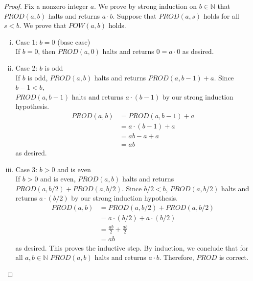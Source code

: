 \documentclass[11pt]{scrartcl}
\begin{document}
\begin{proof}
	Fix a nonzero integer $a$. We prove by strong induction on
	$b \in \mathbb{N}$ that $PROD(a, b)$ halts and returns $a \cdot b$.
	Suppose that $PROD(a, s)$ holds for all $s < b$. We prove that $POW(a, b)$ holds.
	\begin{enumerate}[i.]
		\item{
		      Case 1: $b = 0$ (base case)\\
		      If $b = 0$, then $PROD(a,0)$ halts and returns $0 = a \cdot 0$ as desired.
		      }
		\item{
		      Case 2: $b$ is odd\\
		      If $b$ is odd, $PROD(a,b)$ halts and returns $PROD(a, b-1)+a$. Since $ b-1 < b$,\\
		      $PROD(a, b-1)$ halts and returns $a \cdot (b-1)$ by our strong induction hypothesis.
		      \begin{align*}
			      PROD(a,b) & = PROD(a, b-1)+a     \\
			                & = a \cdot (b-1)  + a \\
			                & = ab- a  + a         \\
			                & = ab
		      \end{align*}
		      as desired.
		      }
		\item{
		      Case 3: $b > 0$ and is even\\
		      If $b > 0$ and is even, $PROD(a,b)$ halts and returns $PROD(a, b / 2) + PROD(a, b / 2)$.
		      Since $ b/2 < b$,
		      $PROD(a, b / 2)$ halts and returns $a \cdot (b/2)$ by our strong induction hypothesis.
		      \begin{align*}
			      PROD(a,b) & = PROD(a, b / 2) + PROD(a, b / 2) \\
			                & = a \cdot (b/2) + a \cdot (b/2)   \\
			                & = \frac{ab}{2}   + \frac{ab}{2}   \\
			                & = ab
			  \end{align*}
			  as desired. 
			  This proves the inductive step. By induction, we conclude that for all $a,b \in  \mathbb{N}$ 
			  $PROD(a, b)$ halts and returns $a \cdot b$. Therefore, $PROD$ is correct.
		      }
	\end{enumerate}
\end{proof}
\end{document}
